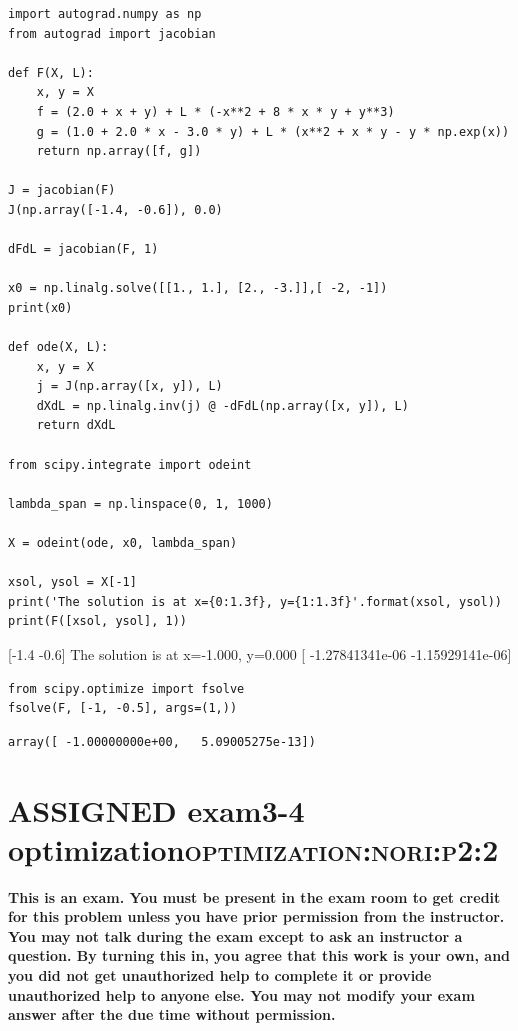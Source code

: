 \documentclass[11pt]{article}
\begin{document}
\begin{verbatim}
import autograd.numpy as np
from autograd import jacobian

def F(X, L):
    x, y = X
    f = (2.0 + x + y) + L * (-x**2 + 8 * x * y + y**3)
    g = (1.0 + 2.0 * x - 3.0 * y) + L * (x**2 + x * y - y * np.exp(x))
    return np.array([f, g])

J = jacobian(F)
J(np.array([-1.4, -0.6]), 0.0)

dFdL = jacobian(F, 1)

x0 = np.linalg.solve([[1., 1.], [2., -3.]],[ -2, -1])
print(x0)

def ode(X, L):
    x, y = X
    j = J(np.array([x, y]), L)
    dXdL = np.linalg.inv(j) @ -dFdL(np.array([x, y]), L)
    return dXdL

from scipy.integrate import odeint

lambda_span = np.linspace(0, 1, 1000)

X = odeint(ode, x0, lambda_span)

xsol, ysol = X[-1]
print('The solution is at x={0:1.3f}, y={1:1.3f}'.format(xsol, ysol))
print(F([xsol, ysol], 1))
\end{verbatim}

[-1.4 -0.6]
The solution is at x=-1.000, y=0.000
[ -1.27841341e-06  -1.15929141e-06]



\begin{verbatim}
from scipy.optimize import fsolve
fsolve(F, [-1, -0.5], args=(1,))
\end{verbatim}

\begin{verbatim}
array([ -1.00000000e+00,   5.09005275e-13])
\end{verbatim}

\section{{\bfseries\sffamily ASSIGNED} exam3-4 optimization\hfill{}\textsc{optimization:nori:p2:2}}
\label{sec:org551ba2a}
\textbf{This is an exam. You must be present in the exam room to get credit for this problem unless you have prior permission from the instructor. You may not talk during the exam except to ask an instructor a question. By turning this in, you agree that this work is your own, and you did not get unauthorized help to complete it or provide unauthorized help to anyone else. You may not modify your exam answer after the due time without permission.}
\end{document}
